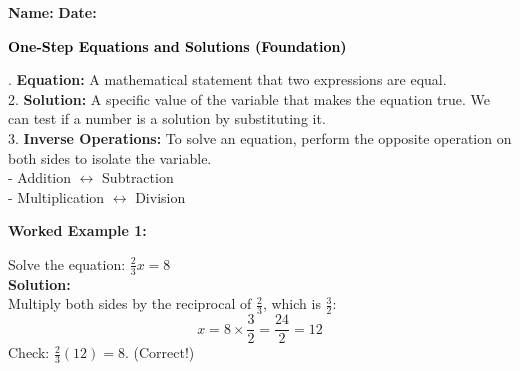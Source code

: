\documentclass[12pt, letterpaper, fleqn]{article}
\begin{document}
\textbf{Name:} \underline{\hspace{5cm}}
\hfill
\textbf{Date:} \underline{\hspace{3cm}}\\

\begin{tcolorbox}[colback=black!10]
    \large\textcolor{black}{\textbf{One-Step Equations and Solutions (Foundation)}}
\end{tcolorbox}

\vspace{3mm}

. \textbf{Equation:} A mathematical statement that two expressions are equal. \\
2. \textbf{Solution:} A specific value of the variable that makes the equation true. We can test if a number is a solution by substituting it. \\
3. \textbf{Inverse Operations:} To solve an equation, perform the opposite operation on both sides to isolate the variable. \\
- Addition $\leftrightarrow$ Subtraction \\
- Multiplication $\leftrightarrow$ Division

\vspace{4mm}

\begin{tcolorbox}[colback=white, colframe=black!25, boxrule=0.6pt, arc=4mm, left=6mm, right=6mm, top=5mm, bottom=5mm]
\textbf{Worked Example 1:}

\medskip
\noindent
Solve the equation: $\frac{2}{3}x = 8$\\
\textbf{Solution:} \\
Multiply both sides by the reciprocal of $\frac{2}{3}$, which is $\frac{3}{2}$:\\
$$x = 8 \times \frac{3}{2} = \frac{24}{2} = 12$$
Check: $\frac{2}{3}(12) = 8$. (Correct!)
\end{tcolorbox}

\vspace{4mm}
\end{document}
